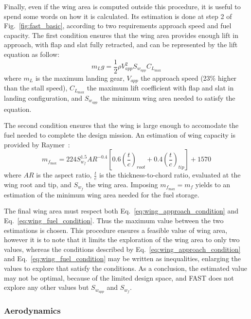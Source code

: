 Finally, even if the wing area is computed outside this procedure, it is useful to spend some words on how it is calculated.
Its estimation is done at step 2 of Fig.~\ref{fig:fast_basic}, according to two requirements approach speed and fuel capacity. 
The first condition ensures that the wing area provides enough lift in approach, with flap and slat fully retracted, and can be represented by the lift equation as follow:
\begin{equation}
\label{eq:wing_approach_condition}
m_{L}g = \frac{1}{2}\rho V_{app}^2 S_{w_{app}} C_{L_{\max}}
\end{equation}
where $m_{L}$ is the maximum landing gear, $V_{app}$ the approach speed (23\% higher than the stall speed), $C_{L_{\max}}$ the maximum lift coefficient with flap and slat in landing configuration, and $S_{w_{app}}$ the minimum wing area needed to satisfy the equation. 

The second condition ensures that the wing is large enough to accomodate the fuel needed to complete the design mission. 
An estimation of wing capacity is provided by Raymer~\cite{bib:raymer}:
\begin{equation}
\label{eq:wing_fuel_condition}
m_{f_{\max}} = 224 S_{w_{f}}^{1.5}AR^{-0.4}\left[0.6\left(\frac{t}{c}\right)_{root}+0.4\left(\frac{t}{c}\right)_{tip}\right]+1570
\end{equation}
where $AR$ is the aspect ratio, $\frac{t}{c}$ is the thickness-to-chord ratio, evaluated at the wing root and tip, and $S_{w_{f}}$ the wing area. 
Imposing $m_{f_{\max}}=m_f$ yields to an estimation of the minimum wing area needed for the fuel storage.

The final wing area must respect both Eq.~\eqref{eq:wing_approach_condition} and Eq.~\eqref{eq:wing_fuel_condition}.
Thus the maximum value between the two estimations is chosen.
This procedure ensures a feasible value of wing area, however it is to note that it limits the exploration of the wing area to only two values, whereas the conditions described by Eq.~\eqref{eq:wing_approach_condition} and Eq.~\eqref{eq:wing_fuel_condition} may be written as inequalities, enlarging the values to explore that satisfy the conditions. 
As a conclusion, the estimated value may not be optimal, because of the limited design space, and FAST does not explore any other values but $S_{w_{app}}$ and $S_{w_{f}}$.

\subsubsection{Aerodynamics}
\label{subsubsec:chap2_fast_aero}

